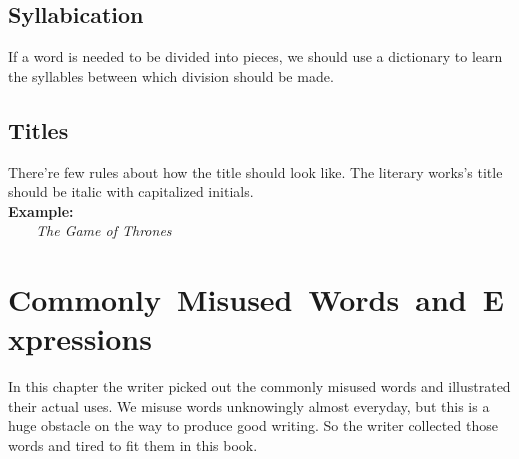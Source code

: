 \documentclass[12pt]{report}
\newcommand{\xmpl}{\textbf{Example:}\\} %
\newcommand{\indnt}{\ \ \ \ } %
\begin{document}
\section{Syllabication}
If a word is needed to be divided into pieces, we should use a dictionary to learn the syllables between which division should be made.


\section{Titles}
There're few rules about how the title should look like. The literary works's title should be italic with capitalized initials.\\
\xmpl
\indnt \textit{The Game of Thrones}



\chapter{\mbox{Commonly Misused Words and Expressions}}
In this chapter the writer picked out the commonly misused words and illustrated their actual uses. We misuse words unknowingly almost everyday, but this is a huge obstacle on the way to produce good writing. So the writer collected those words and tired to fit them in this book.
\end{document}
